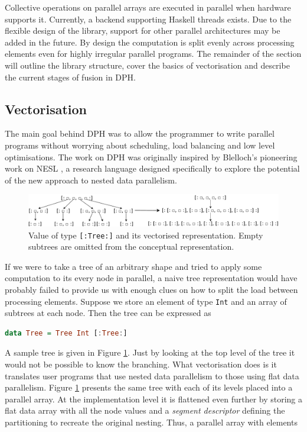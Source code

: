 \documentclass[preamble.tex]{subfiles}
\begin{document}
Collective operations on parallel arrays are executed in parallel when hardware supports it. Currently, a backend supporting Haskell threads \cite{Jones08atutorial} exists. Due to the flexible design of the library, support for other parallel architectures may be added in the future. By design the computation is split evenly across processing elements even for highly irregular parallel programs. The remainder of the section will outline the library structure, cover the basics of vectorisation and describe the current stages of fusion in DPH.


\subsection{Vectorisation}

The main goal behind DPH was to allow the programmer to write parallel programs without worrying about scheduling, load balancing and low level optimisations. The work on DPH was originally inspired by Blelloch's pioneering work on NESL \cite{BCH+}, a research language designed specifically to explore the potential of the new approach to nested data parallelism.

\begin{figure}
\includegraphics[width=1\textwidth]{img/TreeRepr}

\caption{\label{fig:Lit:Tree}{Value of type \texttt{{[}:Tree:{]}} and its vectorised representation. Empty subtrees are omitted from the conceptual representation.}}
\end{figure}


If we were to take a tree of an arbitrary shape and tried to apply some computation to its every node in parallel, a naive tree representation would have probably failed to provide us with enough clues on how to split the load between processing elements. Suppose we store an element of type \texttt{Int} and an array of subtrees at each node. Then the tree can be expressed as

\begin{lstlisting}[basicstyle={\ttfamily},language=Haskell,tabsize=4]
data Tree = Tree Int [:Tree:]
\end{lstlisting}


A sample tree is given in Figure \ref{fig:Lit:Tree}. Just by looking at the top level of the tree it would not be possible to know the branching. What vectorisation does is it translates user programs that use nested data parallelism to those using flat data parallelism. Figure \ref{fig:Lit:Tree} presents the same tree with each of its levels placed into a parallel array. At the implementation level it is flattened even further by storing a flat data array with all the node values and a \emph{segment descriptor} defining the partitioning to recreate the original nesting. Thus, a parallel array with elements
\end{document}
